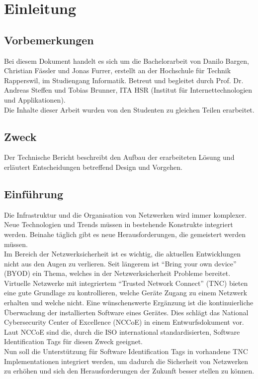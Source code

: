 \chapter{Einleitung}

\section{Vorbemerkungen}
Bei diesem Dokument handelt es sich um die Bachelorarbeit von Danilo Bargen,
Christian Fässler und Jonas Furrer, erstellt an der Hochschule für Technik Rapperswil, 
im Studiengang Informatik. Betreut und begleitet durch Prof. Dr.
Andreas Steffen und Tobias Brunner, ITA HSR (Institut für Internettechnologien
und Applikationen).\\
Die Inhalte dieser Arbeit wurden von den Studenten zu gleichen Teilen
erarbeitet.

\section{Zweck}
Der Technische Bericht beschreibt den Aufbau der erarbeiteten Lösung und
erläutert Entscheidungen betreffend Design und Vorgehen.

\section{Einführung}
Die Infrastruktur und die Organisation von Netzwerken wird immer komplexer. Neue
Technologien und Trends müssen in bestehende Konstrukte integriert werden.
Beinahe täglich gibt es neue Herausforderungen, die gemeistert werden müssen.\\
Im Bereich der Netzwerksicherheit ist es wichtig, die aktuellen Entwicklungen
nicht aus den Augen zu verlieren. Seit längerem ist \enquote{Bring your own
device} (BYOD) ein Thema, welches in der Netzwerksicherheit Probleme bereitet.
Virtuelle Netzwerke mit integriertem \enquote{Trusted Network Connect} (TNC)
bieten eine gute Grundlage zu kontrollieren, welche Geräte Zugang zu einem
Netzwerk erhalten und welche nicht. Eine wünschenswerte Ergänzung ist die
kontinuierliche Überwachung der installierten Software eines Gerätes. Dies
schlägt das National Cybersecurity Center of Excellence (NCCoE) in einem
Entwurfsdokument vor. Laut NCCoE sind die, durch die ISO international
standardisierten, Software Identification Tags für diesen Zweck geeignet.\\
Nun soll die Unterstützung für Software Identification Tags in vorhandene TNC
Implementationen integriert werden, um dadurch die Sicherheit von Netzwerken zu
erhöhen und sich den Herausforderungen der Zukunft besser stellen zu können.
